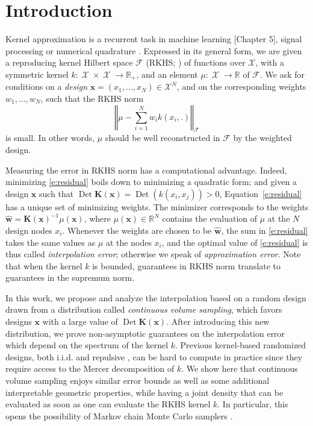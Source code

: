 \documentclass[twoside,11pt]{book}
\numberwithin{theorem}{chapter}
\numberwithin{definition}{chapter}
\numberwithin{proposition}{chapter}
\numberwithin{corollary}{chapter}
\numberwithin{example}{chapter}
\numberwithin{lemma}{chapter}
\numberwithin{assumption}{chapter}
\DeclareMathOperator{\Det}{Det}
\DeclareMathOperator{\X}{\mathcal{X}}
\newcommand{\pc}[1]{\textcolor{blue}{#1}}
\begin{document}
\section{Introduction}
\label{CVS_sec:introduction}
Kernel approximation is a recurrent task in machine learning  \citep*{HaTiFr09}[Chapter 5], signal processing \citep{Uns00} or numerical quadrature \citep{Lar72}. Expressed in its general form, we are given a reproducing kernel Hilbert space $\mathcal{F}$ (RKHS; \citealp{BeTh11}) of functions over $\mathcal{X}$, with a symmetric kernel $k: \X \times \X \rightarrow \mathbb{R}_{+}$, and an element $\mu : \X \rightarrow \mathbb{R}$ of $\mathcal{F}$. We ask for conditions on a \emph{design} $\bm{x} = (x_{1},\dots,x_N)\in \mathcal{X}^N$, and on the corresponding weights $w_1,\dots,w_N$, such that the RKHS norm
\begin{equation}
\left\Vert \mu - \sum_{i=1}^N w_{i}k(x_{i},.)\right\Vert_{\mathcal{F}}
\label{CVS_e:residual}
\end{equation}
is small. In other words, $\mu$ should be well reconstructed in $\mathcal{F}$ by the weighted design.

Measuring the error in RKHS norm has a computational advantage. Indeed, minimizing \eqref{e:residual} boils down to minimizing a quadratic form; and given a design $\bm{x}$ such that $\Det \bm{K}(\bm{x}) = \Det (k(x_i,x_j)) >0$, Equation~\eqref{e:residual} has a unique set of minimizing weights. The minimizer corresponds to the weights $\hat{\bm{w}} = \bm{K}(\bm{x})^{-1} \mu(\bm{x})$, where $\mu(\bm{x})\in\mathbb{R}^N$ contains the evaluation of $\mu$ at the $N$ design nodes $x_{i}$. Whenever the weights are chosen to be $\hat{\bm{w}}$, the sum in \eqref{e:residual} takes the same values as $\mu$ at the nodes $x_{i}$, and the optimal value of \eqref{e:residual} is thus called \emph{interpolation error}; otherwise we speak of \emph{approximation error}.
Note that when the kernel $k$ is bounded, guarantees in RKHS norm translate to guarantees in the supremum norm.

In this work, we propose and analyze the interpolation based on a random design drawn from a distribution called \emph{continuous volume sampling}, which favors designs $\bm{x}$ with a large value of $\Det \bm{K}(\bm{x})$. After introducing this new distribution, we prove non-asymptotic guarantees on the interpolation error which depend on the spectrum of the kernel $k$. Previous kernel-based randomized designs, both i.i.d. \citep{Bac17} and repulsive \citep{BeBaCh19}, can be hard to compute in practice since they require access to the Mercer decomposition of $k$. We show here that continuous volume sampling enjoys similar error bounds as well as some additional interpretable geometric properties, while having a joint density that can be evaluated as soon as one can evaluate the RKHS kernel $k$. In particular, this opens the possibility of Markov chain Monte Carlo samplers \citep{ReGh19}.
\end{document}
